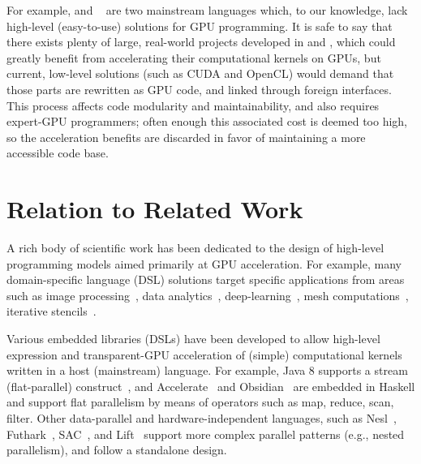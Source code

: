%
For example, \csharp{} and \fsharp{}~\cite{CLR-Generics} are two mainstream 
languages which, to our knowledge, lack high-level (easy-to-use) solutions 
for GPU programming.
%
It is safe to say that there exists plenty of large, real-world projects
developed in \csharp{} and \fsharp{}, which could greatly benefit from 
accelerating their computational kernels on GPUs, but current, low-level
solutions (such as CUDA and OpenCL) would demand that those parts are 
rewritten as GPU code, and linked through foreign interfaces. 
This process affects code modularity and maintainability, and also requires
expert-GPU programmers; often enough this associated cost is deemed too high,
so the acceleration benefits are discarded in favor of maintaining a more 
accessible code base.

\section{Relation to Related Work}
%
A rich body of scientific work has been dedicated to the design of high-level 
programming models aimed primarily at GPU acceleration.  
%
For example, many domain-specific language (DSL) solutions target specific 
applications from areas such as image processing~\cite{Halide}, data 
analytics~\cite{HPAT}, deep-learning~\cite{DeliteDSLs}, mesh 
computations~\cite{OP2-Mesh}, iterative stencils~\cite{tang2011pochoir}. 

Various embedded libraries (DSLs) have been developed to allow high-level
expression and transparent-GPU acceleration of (simple) computational 
kernels written in a host (mainstream) language. For example, 
Java $8$ supports a stream (flat-parallel) construct~\cite{StreamJava8},
and Accelerate~\cite{Accelerate-DAMP,AccelerateStreaming} and 
Obsidian~\cite{svensson2011obsidian} are embedded in Haskell and support 
flat parallelism by means of operators such as map, reduce, scan, filter.
%
Other data-parallel and hardware-independent languages, such as 
Nesl~\cite{blelloch1994implementation,Bergstrom:2012:NDG:2398856.2364563},
Futhark~\cite{pldi17,Futhark:redomap,Futhark-ICFP18}, 
SAC~\cite{SaCShared2005,GrelSchoIJPP06}, and Lift~\cite{Lift-CGO17,Lift-ICFP}
support more complex parallel patterns (e.g., nested parallelism), 
and follow a standalone design.

